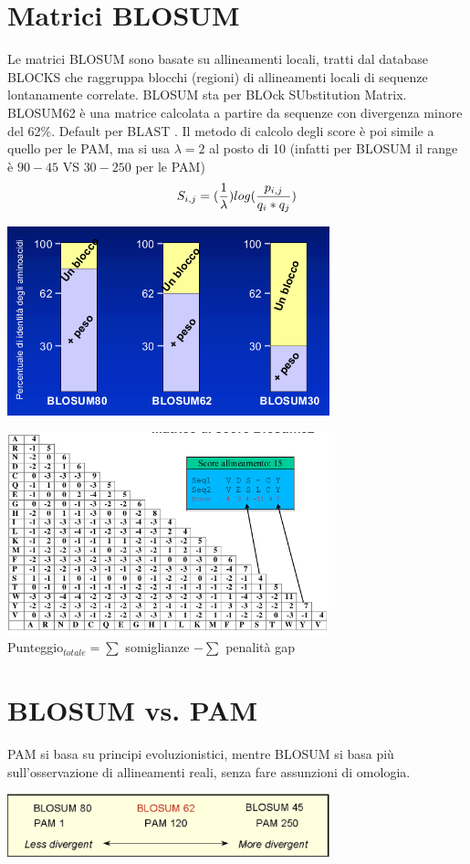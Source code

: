 \documentclass{article}
\begin{document}
\section{Matrici BLOSUM}
Le matrici BLOSUM sono basate su allineamenti locali, tratti
dal database BLOCKS che raggruppa blocchi (regioni) di
allineamenti locali di sequenze lontanamente correlate. BLOSUM sta per BLOck SUbstitution Matrix.\\
BLOSUM62 è una matrice calcolata a partire da sequenze
con divergenza minore del 62\%. Default per BLAST .
Il metodo di calcolo degli score è poi simile a quello per le
PAM, ma si usa $\lambda = 2$ al posto di 10 (infatti per BLOSUM il range è $90-45$ VS $30-250$ per le PAM)
$$ S_{i,j} = ({1\over \lambda}) log ({p_{i,j}\over q_i * q_j})$$
\begin{center}
    \includegraphics[width=0.7\textwidth]{figures/blosum.png}
\end{center}
\begin{center}
    \includegraphics[width=0.7\textwidth]{figures/scorblosum.png}\\
    \Large
    Punteggio$_{totale} = \sum $ somiglianze $- \sum$ penalità gap
\end{center}
\section{BLOSUM vs. PAM}
PAM si basa su principi evoluzionistici, mentre BLOSUM si basa
più sull'osservazione di allineamenti reali, senza fare assunzioni di
omologia.
\begin{center}
    \includegraphics[width=0.7\textwidth]{figures/vs.png}
\end{center}
\end{document}
